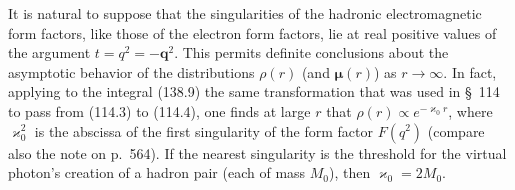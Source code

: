 It is natural to suppose that the singularities of the hadronic electromagnetic form factors, like those of the electron form factors, lie at real positive values of the argument $t=q^2=-\mathbf q^2$. This permits definite conclusions about the asymptotic behavior of the distributions $\rho(r)$ (and $\boldsymbol\mu(r)$) as $r\to\infty$. In fact, applying to the integral (138.9) the same transformation that was used in \S~114 to pass from (114.3) to (114.4), one finds at large $r$ that $\rho(r)\propto e^{-\varkappa_0r}$, where $\varkappa_0^2$ is the abscissa of the first singularity of the form factor $F(q^2)$ (compare also the note on p.~564). If the nearest singularity is the threshold for the virtual photon's creation of a hadron pair (each of mass $M_0$), then $\varkappa_0=2M_0$.
